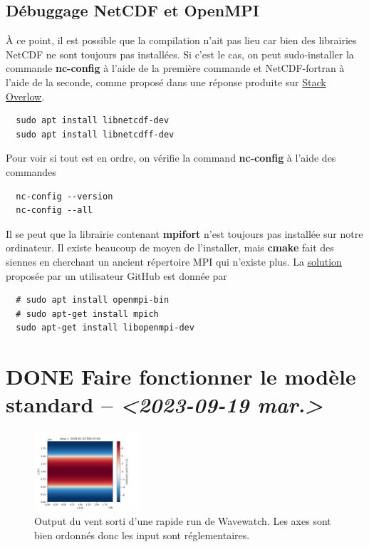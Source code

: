 \documentclass[10pt]{article}
\numberwithin{equation}{section}
\begin{document}
\subsection{Débuggage NetCDF et OpenMPI}
\label{sec:org09f009d}
À ce point, il est possible que la compilation n'ait pas lieu car bien des librairies NetCDF ne sont toujours pas installées.
Si c'est le cas, on peut sudo-installer la commande \textbf{nc-config} à l'aide de la première commande et NetCDF-fortran à l'aide de la seconde, comme proposé dans une réponse produite sur \href{https://stackoverflow.com/questions/73249935/how-to-install-netcdf-fortran-on-ubuntu}{Stack Overlow}.
\begin{verbatim}
  sudo apt install libnetcdf-dev
  sudo apt install libnetcdff-dev
\end{verbatim}
Pour voir si tout est en ordre, on vérifie la command \textbf{nc-config} à l'aide des commandes
\begin{verbatim}
  nc-config --version
  nc-config --all
\end{verbatim}

Il se peut que la librairie contenant \textbf{mpifort} n'est toujours pas installée sur notre ordinateur.
Il existe beaucoup de moyen de l'installer, mais \textbf{cmake} fait des siennes en cherchant un ancient répertoire MPI qui n'existe plus.
La \href{https://github.com/pytorch/pytorch/issues/33521}{solution} proposée par un utilisateur GitHub est donnée par
\begin{verbatim}
  # sudo apt install openmpi-bin
  # sudo apt-get install mpich
  sudo apt-get install libopenmpi-dev
\end{verbatim}


\section{{\bfseries\sffamily DONE} Faire fonctionner le modèle standard -- \textit{<2023-09-19 mar.>}}
\label{sec:orge73f709}
\begin{figure}\vspace{-\baselineskip} \centering \hspace{0.5cm}
\centering
\includegraphics[width=0.35\textwidth]{figures/tests/2023_09_20_east_wind_from_ww3.png}
\caption{\label{fig:org65de9d3}Output du vent sorti d'une rapide run de Wavewatch. Les axes sont bien ordonnés donc les input sont réglementaires.}
\end{figure}
\end{document}
